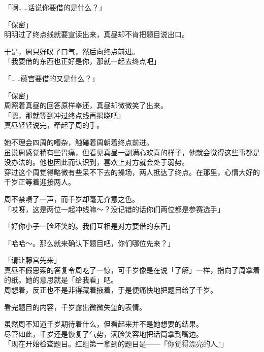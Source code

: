 「啊……话说你要借的是什么？」

「保密」\\

明明过了终点线就要宣读出来，真昼却不肯把题目说出口。

于是，周只好叹了口气，然后向终点前进。\\

「我要借的东西也正好是你，那就一起去终点吧」

「……藤宫要借的又是什么？」

「保密」\\

周照着真昼的回答原样奉还，真昼却微微笑了出来。\\

「嗯，那就等到冲过终点线再揭晓吧」\\

真昼轻轻说完，牵起了周的手。

她不理会四周的嘈杂，触碰着周朝着终点前进。\\

虽说周感觉稍有些胃痛，但看见真昼一副满心欢喜的样子，他就会觉得这些事都是没办法的。他也因此而认识到，喜欢上对方就会处于弱势。\\

穿过这个周觉得略微有些呆不下去的操场，两人抵达了终点。在那里，心情大好的千岁正等着迎接两人。

周不禁啧了一声，而千岁却毫无介意之色。\\

「哎呀，这是两位一起冲线嘛～？没记错的话你们两位都是参赛选手」

「好你小子一脸坏笑的。我们互相是对方要借的东西」

「哈哈～。那么就来确认下题目吧，你们哪位先来？」

「请让藤宫先来」\\

真昼不假思索的答复令周吃了一惊，可千岁像是在说「了解」一样，指向了周拿着的纸。她的意思就是「给我看」吧。\\

周想着，反正也不是非得藏着掖着，于是便痛快地把题目给了千岁。

看完题目的内容，千岁露出微微失望的表情。

虽然周不知道千岁期待着什么，但看起来并不是她想要的结果。\\

尽管如此，千岁还是恢复了气势，满脸笑容地把话筒拿到嘴边。\\

「现在开始检查题目。红组第一拿到的题目是——『你觉得漂亮的人』」\\

